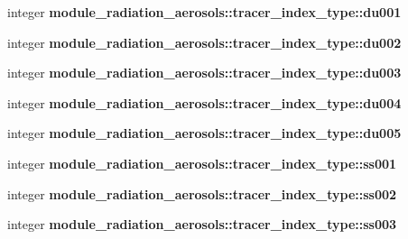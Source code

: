 \begin{DoxyCompactItemize}
\item 
\mbox{\label{group__module__radiation__aerosols_gaf4355efd112704adbaeab5a3fd1d7912}} 
integer {\bfseries module\+\_\+radiation\+\_\+aerosols\+::tracer\+\_\+index\+\_\+type\+::du001}
\item 
\mbox{\label{group__module__radiation__aerosols_gab68920703fa2cda7cbc42cb568a2ed56}} 
integer {\bfseries module\+\_\+radiation\+\_\+aerosols\+::tracer\+\_\+index\+\_\+type\+::du002}
\item 
\mbox{\label{group__module__radiation__aerosols_ga9b2422518e2c8aaba9f0b64bd0c4676a}} 
integer {\bfseries module\+\_\+radiation\+\_\+aerosols\+::tracer\+\_\+index\+\_\+type\+::du003}
\item 
\mbox{\label{group__module__radiation__aerosols_ga69658f70ffccecfae1751c227ec1b14c}} 
integer {\bfseries module\+\_\+radiation\+\_\+aerosols\+::tracer\+\_\+index\+\_\+type\+::du004}
\item 
\mbox{\label{group__module__radiation__aerosols_gaabd67af89106955952b0010bb3a70e4e}} 
integer {\bfseries module\+\_\+radiation\+\_\+aerosols\+::tracer\+\_\+index\+\_\+type\+::du005}
\item 
\mbox{\label{group__module__radiation__aerosols_gacce0ecff4d4e84dffc0c23965053ac36}} 
integer {\bfseries module\+\_\+radiation\+\_\+aerosols\+::tracer\+\_\+index\+\_\+type\+::ss001}
\item 
\mbox{\label{group__module__radiation__aerosols_ga9e96ed67b1e072d97314bc9e6e09eee7}} 
integer {\bfseries module\+\_\+radiation\+\_\+aerosols\+::tracer\+\_\+index\+\_\+type\+::ss002}
\item 
\mbox{\label{group__module__radiation__aerosols_ga5aef8974607bb85ae1a23598a402adfb}} 
integer {\bfseries module\+\_\+radiation\+\_\+aerosols\+::tracer\+\_\+index\+\_\+type\+::ss003}
\item 
\mbox{\label{group__module__radiation__aerosols_ga88d0024b6f7f6fa3ae4e1da0e9ce7db8}} 

\end{DoxyCompactItemize}
